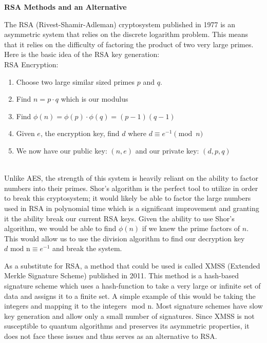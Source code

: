 \documentclass[12pt]{article}
\begin{document}
	\par\vspace{1mm}

\begin{center}
	{\large \bf RSA Methods and an Alternative}
\end{center}

The RSA (Rivest-Shamir-Adleman) cryptosystem published in 1977 is an asymmetric system that relies on the discrete logarithm problem. This means that it relies on the difficulty of factoring the product of two very large primes. Here is the basic idea of the RSA key generation:\\

RSA Encryption:\cite{crypto}\cite{RSA}
\begin{enumerate}
    \item Choose two large similar sized primes $p$ and $q$.
    \item Find $n=p\cdot q$ which is our modulus
    \item Find $\phi(n)=\phi(p)\cdot\phi(q)=(p-1)(q-1)$
    \item Given $e$, the encryption key, find $d$ where $d\equiv e^{-1}\pmod{n}$
    \item We now have our public key: $(n,e)$ and our private key: $(d,p,q)$
\end{enumerate}\\

Unlike AES, the strength of this system is heavily reliant on the ability to factor numbers into their primes. Shor's algorithm is the perfect tool to utilize in order to break this cryptosystem; it would likely be able to factor the large numbers used in RSA in polynomial time which is a significant improvement and granting it the ability break our current RSA keys. Given the ability to use Shor's algorithm, we would be able to find $\phi(n)$ if we knew the prime factors of $n$. This would allow us to use the division algorithm to find our decryption key $d \text{ mod n} \equiv e^{-1}$ and break the system.

As a substitute for RSA, a method that could be used is called XMSS (Extended Merkle Signature Scheme) published in 2011\cite{hash}. This method is a hash-based signature scheme which uses a hash-function to take a very large or infinite set of data and assigns it to a finite set. A simple example of this would be taking the integers and mapping it to the integers $\text{ mod n}$. Most signature schemes have slow key generation and allow only a small number of signatures. Since XMSS is not susceptible to quantum algorithms and preserves its asymmetric properties, it does not face these issues and thus serves as an alternative to RSA\cite{tools}.
\end{document}
